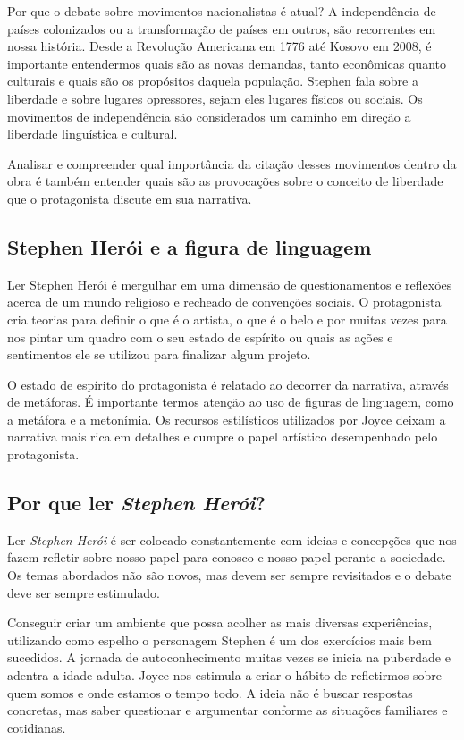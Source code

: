 \documentclass[12pt]{extarticle}
\begin{document}
{Por que o debate sobre movimentos nacionalistas é atual? A independência
de países colonizados ou a transformação de países em outros, são
recorrentes em nossa história. Desde a Revolução Americana em 1776 até
Kosovo em 2008, é importante entendermos quais são as novas demandas,
tanto econômicas quanto culturais e quais são os propósitos daquela
população. Stephen fala sobre a liberdade e sobre lugares opressores,
sejam eles lugares físicos ou sociais. Os movimentos de independência
são considerados um caminho em direção a liberdade linguística e
cultural.

Analisar e compreender qual importância da citação desses movimentos
dentro da obra é também entender quais são as provocações sobre o
conceito de liberdade que o protagonista discute em sua narrativa.

\subsection{Stephen Herói e a figura de linguagem}

Ler Stephen Herói é mergulhar em uma dimensão de questionamentos e
reflexões acerca de um mundo religioso e recheado de convenções sociais.
O protagonista cria teorias para definir o que é o artista, o que é o
belo e por muitas vezes para nos pintar um quadro com o seu estado de
espírito ou quais as ações e sentimentos ele se utilizou para finalizar
algum projeto.

O estado de espírito do protagonista é relatado ao decorrer da
narrativa, através de metáforas. É importante termos atenção ao uso de
figuras de linguagem, como a metáfora e a metonímia. Os recursos
estilísticos utilizados por Joyce deixam a narrativa mais rica em
detalhes e cumpre o papel artístico desempenhado pelo protagonista.

\subsection{Por que ler \textit{Stephen Herói}?}

Ler \emph{Stephen Herói} é ser colocado constantemente com ideias e
concepções que nos fazem refletir sobre nosso papel para conosco e nosso
papel perante a sociedade. Os temas abordados não são novos, mas devem
ser sempre revisitados e o debate deve ser sempre estimulado.

Conseguir criar um ambiente que possa acolher as mais diversas
experiências, utilizando como espelho o personagem Stephen é um dos
exercícios mais bem sucedidos. A jornada de autoconhecimento muitas
vezes se inicia na puberdade e adentra a idade adulta. Joyce nos
estimula a criar o hábito de refletirmos sobre quem somos e onde estamos
o tempo todo. A ideia não é buscar respostas concretas, mas saber
questionar e argumentar conforme as situações familiares e cotidianas.

}
\end{document}
